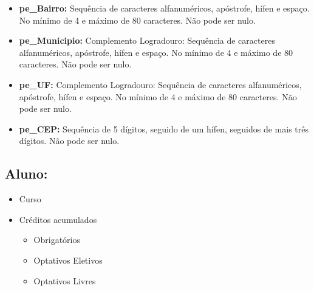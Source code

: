 \documentclass{report}
\begin{document}
\begin{itemize}
\begin{itemize}
  	\item \textbf{pe\_Bairro:} Sequência de caracteres alfanuméricos, apóstrofe, hífen e espaço. No mínimo de 4 e máximo de 80 caracteres. Não pode ser nulo.
  	\item \textbf{pe\_Municipio:} Complemento Logradouro: Sequência de caracteres alfanuméricos, apóstrofe, hífen e espaço. No mínimo de 4 e máximo de 80 caracteres. Não pode ser nulo.
  	\item \textbf{pe\_UF:} Complemento Logradouro: Sequência de caracteres alfanuméricos, apóstrofe, hífen e espaço. No mínimo de 4 e máximo de 80 caracteres. Não pode ser nulo.
  	\item \textbf{pe\_CEP:} Sequência de 5 dígitos, seguido de um hífen, seguidos de mais três dígitos. Não pode ser nulo.
  	\end{itemize}
\end{itemize}

\subsection{Aluno:}
\begin{itemize}
  \item Curso
  \item Créditos acumulados
  \begin{itemize}
  	\item Obrigatórios
  	\item Optativos Eletivos
  	\item Optativos Livres
  \end{itemize}

\end{itemize}
\end{document}
